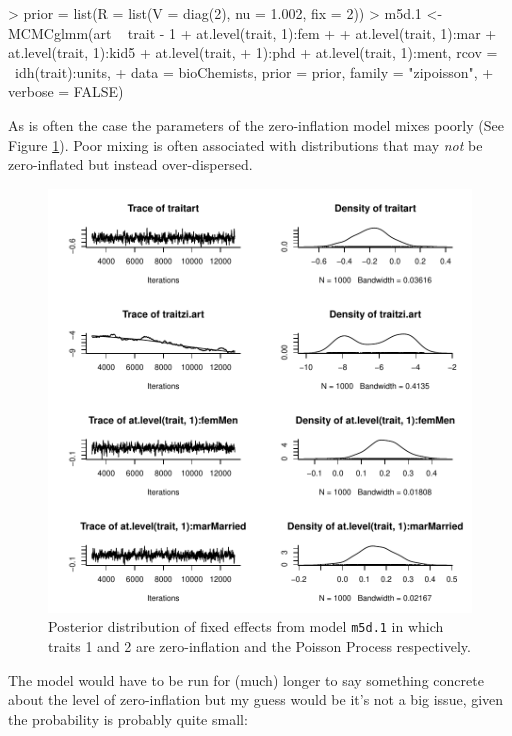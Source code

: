 \documentclass{article}
\begin{document}
\begin{Schunk}
\begin{Sinput}
> prior = list(R = list(V = diag(2), nu = 1.002, fix = 2))
> m5d.1 <- MCMCglmm(art ~ trait - 1 + at.level(trait, 1):fem + 
+     at.level(trait, 1):mar + at.level(trait, 1):kid5 + at.level(trait, 
+     1):phd + at.level(trait, 1):ment, rcov = ~idh(trait):units, 
+     data = bioChemists, prior = prior, family = "zipoisson", 
+     verbose = FALSE)
\end{Sinput}
\end{Schunk}

As is often the case the parameters of the zero-inflation model mixes poorly (See Figure \ref{ZIP}). Poor mixing is often associated with distributions that may \emph{not} be zero-inflated but instead over-dispersed.\\  


\begin{figure}[!h]
\begin{center}
\includegraphics{Lecture5-039}
\end{center}
\caption{Posterior distribution of fixed effects from model \texttt{m5d.1} in which traits 1 and 2 are zero-inflation and the Poisson Process respectively.}
\label{ZIP}
\end{figure}

The model would have to be run for (much) longer to say something concrete about the level of zero-inflation but my guess would be it's not a big issue, given the probability is probably quite small:
\end{document}
